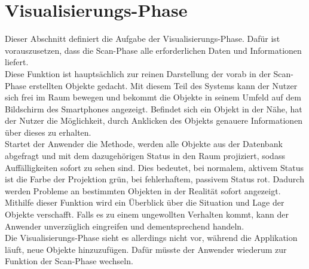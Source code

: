 \section{Visualisierungs-Phase}
\label{chap:Visualisierungs-Phase}
Dieser Abschnitt definiert die Aufgabe der Visualisierungs-Phase. 
Dafür ist vorauszusetzen, dass die Scan-Phase alle erforderlichen Daten und Informationen liefert. 
\\ 
\linebreak
Diese Funktion ist hauptsächlich zur reinen Darstellung der vorab in der Scan-Phase erstellten Objekte gedacht. Mit diesem Teil des Systems 
kann der Nutzer sich frei im Raum bewegen und bekommt die Objekte in seinem Umfeld auf dem Bildschirm des Smartphones angezeigt. 
Befindet sich ein Objekt in der Nähe, hat der Nutzer die Möglichkeit, durch Anklicken des Objekts genauere Informationen über dieses zu erhalten. 
\\ 
\linebreak 
Startet der Anwender die Methode, werden alle Objekte aus der Datenbank abgefragt und mit dem dazugehörigen Status in den Raum 
projiziert, sodass Auffälligkeiten sofort zu sehen sind. Dies bedeutet, bei normalem, aktivem Status ist die Farbe der Projektion grün, 
bei fehlerhaftem, passivem Status rot. Dadurch werden Probleme an bestimmten Objekten in der Realität sofort angezeigt. %
Mithilfe dieser Funktion wird %
ein Überblick über die Situation und Lage der Objekte verschafft. Falls es zu einem ungewollten Verhalten kommt, 
kann der Anwender unverzüglich eingreifen und dementsprechend handeln. %
\\ 
Die Visualisierungs-Phase sieht es allerdings nicht vor, während die Applikation läuft, neue Objekte hinzuzufügen. Dafür müsste der Anwender wiederum zur 
Funktion der Scan-Phase wechseln. %

